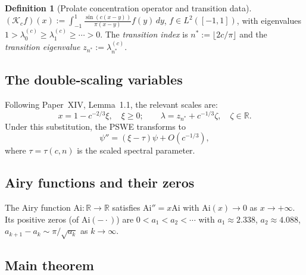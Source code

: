 \documentclass[12pt,a4paper]{amsart}
\theoremstyle{definition}
\newtheorem{definition}[theorem]{Definition}
\newcommand{\Kc}{\mathcal{K}_c}
\newcommand{\lam}[2]{\lambda_{#2}^{(#1)}}
\newcommand{\Ai}{\mathrm{Ai}}
\newcommand{\R}{\mathbb{R}}
\begin{document}
\begin{definition}[Prolate concentration operator and transition data]
$({\Kc} f)(x) := \int_{-1}^1 \frac{\sin(c(x-y))}{\pi(x-y)} f(y)\,dy$,
$f \in L^2([-1,1])$, with eigenvalues
$1 > \lam{c}{0} \geq \lam{c}{1} \geq \cdots > 0$.
The \emph{transition index} is $n^* := \lfloor 2c/\pi \rfloor$
and the \emph{transition eigenvalue} $z_{n^*} := \lam{c}{n^*}$.
\end{definition}

\subsection{The double-scaling variables}

Following Paper~XIV, Lemma~1.1, the relevant scales are:
\begin{equation}\label{eq:scaling}
  x = 1 - c^{-2/3}\xi, \quad \xi \geq 0;\qquad
  \lambda = z_{n^*} + c^{-1/3}\zeta,\quad \zeta \in \R.
\end{equation}
Under this substitution, the PSWE transforms to
\begin{equation}\label{eq:Airyform}
  \psi'' = (\xi - \tau)\psi + O(c^{-1/3}),
\end{equation}
where $\tau = \tau(c,n)$ is the scaled spectral parameter.

\subsection{Airy functions and their zeros}

The Airy function $\Ai : \R \to \R$ satisfies $\Ai'' = x\Ai$ with
$\Ai(x) \to 0$ as $x \to +\infty$.
Its positive zeros (of $\Ai(-\cdot)$) are
$0 < a_1 < a_2 < \cdots$ with
$a_1 \approx 2.338$, $a_2 \approx 4.088$,
$a_{k+1} - a_k \sim \pi/\sqrt{a_k}$ as $k\to\infty$.

\subsection{Main theorem}
\end{document}
